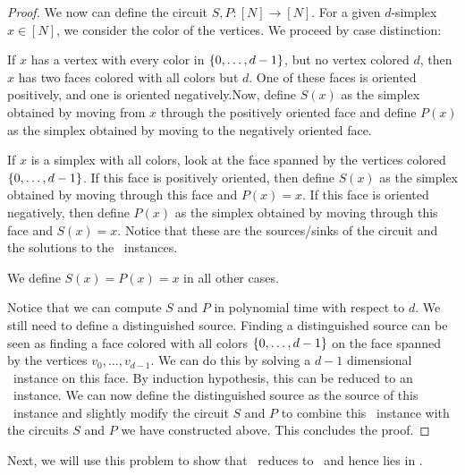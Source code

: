 \begin{proof}
	We now can define the circuit $S, P : [N] \rightarrow [N]$. For a given $d$-simplex $x \in [N]$, we consider the color of the vertices. We proceed by case distinction:
	\begin{case}{1}
		If $x$ has a vertex with every color in $\left\{0, \dots, d-1\right\}$, but no vertex colored $d$, then $x$ has two faces colored with all colors but $d$. One of these faces is oriented positively, and one is oriented negatively.Now, define $S(x)$ as the simplex obtained by moving from $x$ through the positively oriented face and define $P(x)$ as the simplex obtained by moving to the negatively oriented face.
	\end{case}
	\begin{case}{2}
		If $x$ is a simplex with all colors, look at the face spanned by the vertices colored $\left\{0, \dots, d-1\right\}$. If this face is positively oriented, then define $S(x)$ as the simplex obtained by moving through this face and $P(x) = x$. If this face is oriented negatively, then define $P(x)$ as the simplex obtained by moving through this face and $S(x) = x$. Notice that these are the sources/sinks of the circuit and the solutions to the \Sperner\ instances.
	\end{case}
	\begin{case}{3}
		We define $S(x) = P(x) = x$ in all other cases.
	\end{case}
	Notice that we can compute $S$ and $P$ in polynomial time with respect to $d$. We still need to define a distinguished source. Finding a distinguished source can be seen as finding a face colored with all colors $\left\{0, \dots, d-1\right\}$ on the face spanned by the vertices $v_0, \dots, v_{d-1}$. We can do this by solving a $d-1$ dimensional \Sperner\ instance on this face. By induction hypothesis, this can be reduced to an \EndOfLine\ instance. We can now define the distinguished source as the source of this \EndOfLine\ instance and slightly modify the circuit $S$ and $P$ to combine this \EndOfLine\ instance with the circuits $S$ and $P$ we have constructed above. This concludes the proof.
\end{proof}

Next, we will use this problem to show that \Tarskistar\ reduces to \Sperner\ and hence lies in \PPAD.

